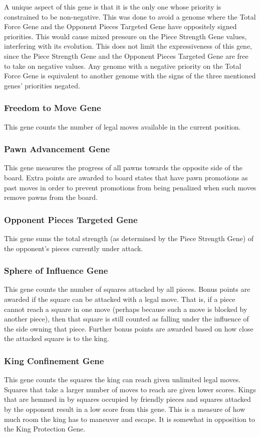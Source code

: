 \documentclass[letterpaper]{article}
\renewcommand\_{\textunderscore\allowbreak}
\begin{document}
A unique aspect of this gene is that it is the only one whose priority is constrained to be non-negative. This was done to avoid a genome where the Total Force Gene and the Opponent Pieces Targeted Gene have oppositely signed priorities. This would cause mixed pressure on the Piece Strength Gene values, interfering with its evolution. This does not limit the expressiveness of this gene, since the Piece Strength Gene and the Opponent Pieces Targeted Gene are free to take on negative values. Any genome with a negative priority on the Total Force Gene is equivalent to another genome with the signs of the three mentioned genes' priorities negated.

\subsubsection{Freedom to Move Gene}
This gene counts the number of legal moves available in the current position.

\subsubsection{Pawn Advancement Gene}
This gene measures the progress of all pawns towards the opposite side of the board. Extra points are awarded to board states that have pawn promotions as past moves in order to prevent promotions from being penalized when such moves remove pawns from the board.

\subsubsection{Opponent Pieces Targeted Gene}
This gene sums the total strength (as determined by the Piece Strength Gene) of the opponent's pieces currently under attack.

\subsubsection{Sphere of Influence Gene}
This gene counts the number of squares attacked by all pieces. Bonus points are awarded if the square can be attacked with a legal move. That is, if a piece cannot reach a square in one move (perhaps because such a move is blocked by another piece), then that square is still counted as falling under the influence of the side owning that piece. Further bonus points are awarded based on how close the attacked square is to the king.

\subsubsection{King Confinement Gene}
This gene counts the squares the king can reach given unlimited legal moves. Squares that take a larger number of moves to reach are given lower scores. Kings that are hemmed in by squares occupied by friendly pieces and squares attacked by the opponent result in a low score from this gene. This is a measure of how much room the king has to maneuver and escape. It is somewhat in opposition to the King Protection Gene.
\end{document}
